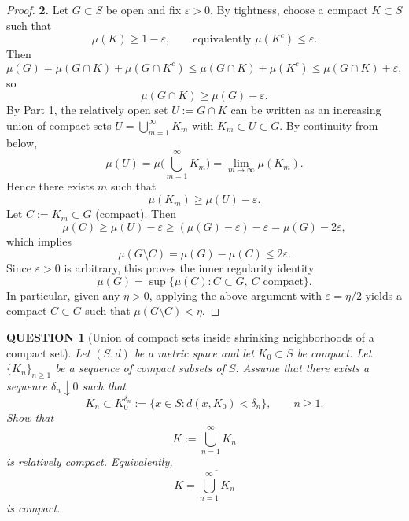 \documentclass[12pt]{article}
\renewcommand{\(}{\left(}%
\renewcommand{\)}{\right)}%
\renewcommand{\[}{\left[}%
\renewcommand{\]}{\right]}%
\newtheorem{question}{QUESTION}[section]}
\newtheorem{proof}{Proof.}}
\begin{document}
\begin{proof}
\medskip
\noindent
\textbf{2.}
Let $G\subset S$ be open and fix $\varepsilon>0$. By tightness, choose a compact $K\subset S$ such that
\begin{equation*}
\mu(K)\ge 1-\varepsilon,
\qquad \text{equivalently } \mu(K^c)\le \varepsilon.
\end{equation*}
Then
\begin{equation*}
\mu(G)=\mu(G\cap K)+\mu(G\cap K^c)\le \mu(G\cap K)+\mu(K^c)\le \mu(G\cap K)+\varepsilon,
\end{equation*}
so
\begin{equation*}
\mu(G\cap K)\ge \mu(G)-\varepsilon.
\end{equation*}
By Part 1, the relatively open set $U:=G\cap K$ can be written as an increasing union of compact sets
$U=\bigcup_{m=1}^\infty K_m$ with $K_m\subset U\subset G$. By continuity from below,
\begin{equation*}
\mu(U)=\mu\Big(\bigcup_{m=1}^\infty K_m\Big)=\lim_{m\to\infty}\mu(K_m).
\end{equation*}
Hence there exists $m$ such that
\begin{equation*}
\mu(K_m)\ge \mu(U)-\varepsilon.
\end{equation*}
Let $C:=K_m\subset G$ (compact). Then
\begin{equation*}
\mu(C)\ge \mu(U)-\varepsilon \ge (\mu(G)-\varepsilon)-\varepsilon=\mu(G)-2\varepsilon,
\end{equation*}
which implies
\begin{equation*}
\mu(G\setminus C)=\mu(G)-\mu(C)\le 2\varepsilon.
\end{equation*}
Since $\varepsilon>0$ is arbitrary, this proves the inner regularity identity
\begin{equation*}
\mu(G)=\sup\{\mu(C): C\subset G,\ C \text{ compact}\}.
\end{equation*}
In particular, given any $\eta>0$, applying the above argument with $\varepsilon=\eta/2$ yields a compact
$C\subset G$ such that $\mu(G\setminus C)<\eta$.
\end{proof}

\begin{question}[Union of compact sets inside shrinking neighborhoods of a compact set]
Let $(S,d)$ be a metric space and let $K_0\subset S$ be compact.
Let $\{K_n\}_{n\ge1}$ be a sequence of \emph{compact} subsets of $S$.
Assume that there exists a sequence $\delta_n\downarrow 0$ such that
\begin{equation*}
K_n \subset K_0^{\delta_n}
:=\{x\in S : d(x,K_0)<\delta_n\},
\qquad n\ge1.
\end{equation*}
Show that
\begin{equation*}
K:=\bigcup_{n=1}^\infty K_n
\end{equation*}
is relatively compact. Equivalently,
\begin{equation*}
\overline{K}=\overline{\bigcup_{n=1}^\infty K_n}
\end{equation*}
is compact.
\end{question}
\end{document}
